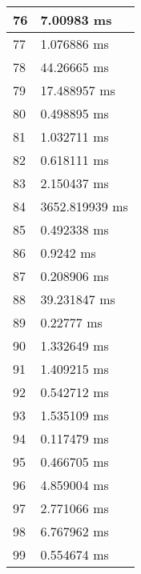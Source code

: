 \begin{multicols}{2}
\begin{tabular}{|l|l|}
		76 & 7.00983 ms \\ \hline
		77 & 1.076886 ms \\ \hline
		78 & 44.26665 ms \\ \hline
		79 & 17.488957 ms \\ \hline
		80 & 0.498895 ms \\ \hline
		81 & 1.032711 ms \\ \hline
		82 & 0.618111 ms \\ \hline
		83 & 2.150437 ms \\ \hline
		84 & 3652.819939 ms \\ \hline
		85 & 0.492338 ms \\ \hline
		86 & 0.9242 ms \\ \hline
		87 & 0.208906 ms \\ \hline
		88 & 39.231847 ms \\ \hline
		89 & 0.22777 ms \\ \hline
		90 & 1.332649 ms \\ \hline
		91 & 1.409215 ms \\ \hline
		92 & 0.542712 ms \\ \hline
		93 & 1.535109 ms \\ \hline
		94 & 0.117479 ms \\ \hline
		95 & 0.466705 ms \\ \hline
		96 & 4.859004 ms \\ \hline
		97 & 2.771066 ms \\ \hline
		98 & 6.767962 ms \\ \hline
		99 & 0.554674 ms \\ \hline
	\end{tabular}\\
\end{multicols}\pagebreak
